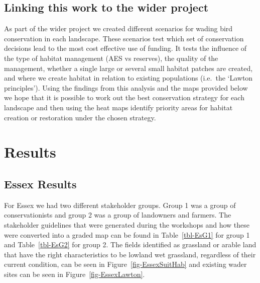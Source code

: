 \documentclass[
  12pt,
  letterpaper,
  DIV=11,
  numbers=noendperiod]{scrartcl}
\begin{document}
\subsection{Linking this work to the wider
project}\label{linking-this-work-to-the-wider-project}

As part of the wider project we created different scenarios for wading
bird conservation in each landscape. These scenarios test which set of
conservation decisions lead to the most cost effective use of funding.
It tests the influence of the type of habitat management (AES vs
reserves), the quality of the management, whether a single large or
several small habitat patches are created, and where we create habitat
in relation to existing populations (i.e.~the `Lawton principles').
Using the findings from this analysis and the maps provided below we
hope that it is possible to work out the best conservation strategy for
each landscape and then using the heat maps identify priority areas for
habitat creation or restoration under the chosen strategy.

\section{Results}\label{results}

\subsection{Essex Results}\label{essex-results}

For Essex we had two different stakeholder groups. Group 1 was a group
of conservationists and group 2 was a group of landowners and farmers.
The stakeholder guidelines that were generated during the workshops and
how these were converted into a graded map can be found in
Table~\ref{tbl-EsG1} for group 1 and Table~\ref{tbl-EsG2} for group 2.
The fields identified as grassland or arable land that have the right
characteristics to be lowland wet grassland, regardless of their current
condition, can be seen in Figure~\ref{fig-EssexSuitHab} and existing
wader sites can be seen in Figure~\ref{fig-EssexLawton}.
\end{document}
